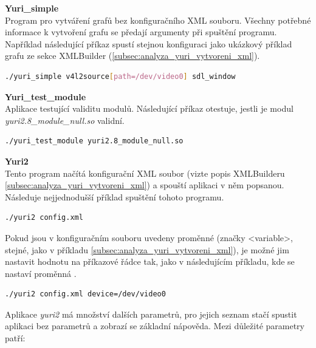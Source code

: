 \documentclass[thesis=M,czech]{FITthesis}[2012/06/26]
\begin{document}
\begin{description}
  \item \textbf{Yuri\_simple\\}
  Program pro vytváření grafů bez konfiguračního XML souboru. Všechny potřebné informace k vytvoření grafu se předají argumenty při spuštění programu. Například následující příkaz spustí stejnou konfiguraci jako ukázkový příklad grafu ze sekce XMLBuilder (\ref{subsec:analyza_yuri_vytvoreni_xml}).\\

\begin{lstlisting}[language=bash,identifierstyle=\color{black}]
./yuri_simple v4l2source[path=/dev/video0] sdl_window
\end{lstlisting}

  \item \textbf{Yuri\_test\_module\\}
  Aplikace testující validitu modulů. Následující příkaz otestuje, jestli je modul \textit{yuri2.8\_module\_null.so} validní.\\

\begin{lstlisting}[language=bash,identifierstyle=\color{black}]
./yuri_test_module yuri2.8_module_null.so
\end{lstlisting}

  \item \textbf{Yuri2\\}
Tento program načítá konfigurační XML soubor (vizte popis XMLBuilderu \ref{subsec:analyza_yuri_vytvoreni_xml}) a spouští aplikaci v něm popsanou. Následuje nejjednodušší příklad spuštění tohoto programu.\\

\begin{lstlisting}[language=bash,identifierstyle=\color{black}]
./yuri2 config.xml
\end{lstlisting}

Pokud jsou v konfiguračním souboru uvedeny proměnné (značky <variable>, stejné, jako v příkladu \ref{subsec:analyza_yuri_vytvoreni_xml}), je možné jim nastavit hodnotu na příkazové řádce tak, jako v následujícím příkladu, kde se nastaví proměnná .\\

\begin{lstlisting}[language=bash,identifierstyle=\color{black}]
./yuri2 config.xml device=/dev/video0
\end{lstlisting}

Aplikace \textit{yuri2} má množství dalších parametrů, pro jejich seznam stačí spustit aplikaci bez parametrů a zobrazí se základní nápověda. Mezi důležité parametry patří:


\end{description}
\end{document}
